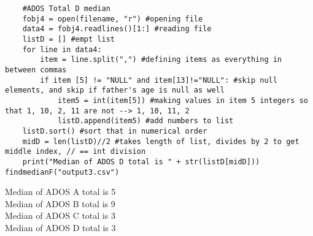 \documentclass{article}
\begin{document}
\begin{verbatim}
    #ADOS Total D median
    fobj4 = open(filename, "r") #opening file
    data4 = fobj4.readlines()[1:] #reading file
    listD = [] #empt list
    for line in data4:
        item = line.split(",") #defining items as everything in between commas
        if item [5] != "NULL" and item[13]!="NULL": #skip null elements, and skip if father's age is null as well
            item5 = int(item[5]) #making values in item 5 integers so that 1, 10, 2, 11 are not --> 1, 10, 11, 2
            listD.append(item5) #add numbers to list
    listD.sort() #sort that in numerical order
    midD = len(listD)//2 #takes length of list, divides by 2 to get middle index, // == int division
    print("Median of ADOS D total is " + str(listD[midD]))
findmedianF("output3.csv")
\end{verbatim}
Median of ADOS A total is 5\\
Median of ADOS B total is 9\\
Median of ADOS C total is 3\\
Median of ADOS D total is 3\\
\end{document}
